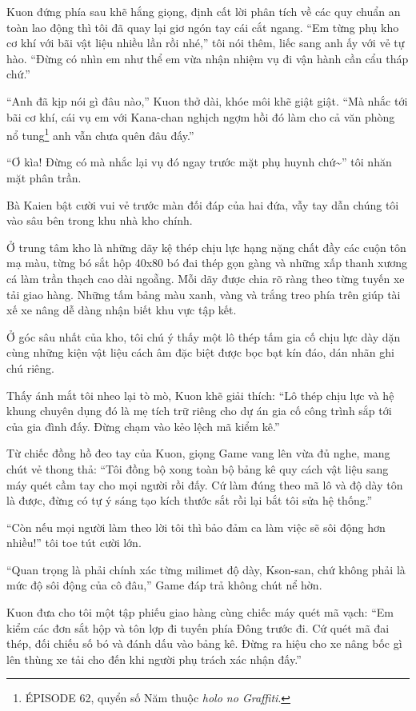 ﻿\documentclass[../main.tex]{subfiles}
\begin{document}
Kuon đứng phía sau khẽ hắng giọng, định cất lời phân tích về các quy chuẩn an toàn lao động thì tôi đã quay lại giơ ngón tay cái cắt ngang. ``Em từng phụ kho cơ khí với bãi vật liệu nhiều lần rồi nhé,'' tôi nói thêm, liếc sang anh ấy với vẻ tự hào. ``Đừng có nhìn em như thể em vừa nhận nhiệm vụ đi vận hành cần cẩu tháp chứ.''

``Anh đã kịp nói gì đâu nào,'' Kuon thở dài, khóe môi khẽ giật giật. ``Mà nhắc tới bãi cơ khí, cái vụ em với Kana-chan nghịch ngợm hồi đó làm cho cả văn phòng nổ tung\footnote{{\flaregothic ÉPISODE 62}, quyển số Năm thuộc \textit{holo no Graffiti}.} anh vẫn chưa quên đâu đấy.''

``Ơ kìa! Đừng có mà nhắc lại vụ đó ngay trước mặt phụ huynh chứ\~{}'' tôi nhăn mặt phân trần.

Bà Kaien bật cười vui vẻ trước màn đối đáp của hai đứa, vẫy tay dẫn chúng tôi vào sâu bên trong khu nhà kho chính.

Ở trung tâm kho là những dãy kệ thép chịu lực hạng nặng chất đầy các cuộn tôn mạ màu, từng bó sắt hộp 40x80 bó đai thép gọn gàng và những xấp thanh xương cá làm trần thạch cao dài ngoẵng. Mỗi dãy được chia rõ ràng theo từng tuyến xe tải giao hàng. Những tấm bảng màu xanh, vàng và trắng treo phía trên giúp tài xế xe nâng dễ dàng nhận biết khu vực tập kết.

Ở góc sâu nhất của kho, tôi chú ý thấy một lô thép tấm gia cố chịu lực dày dặn cùng những kiện vật liệu cách âm đặc biệt được bọc bạt kín đáo, dán nhãn ghi chú riêng.

Thấy ánh mắt tôi nheo lại tò mò, Kuon khẽ giải thích: ``Lô thép chịu lực và hệ khung chuyên dụng đó là mẹ tích trữ riêng cho dự án gia cố công trình sắp tới của gia đình đấy. Đừng chạm vào kẻo lệch mã kiểm kê.''

Từ chiếc đồng hồ đeo tay của Kuon, giọng Game vang lên vừa đủ nghe, mang chút vẻ thong thả: ``Tôi đồng bộ xong toàn bộ bảng kê quy cách vật liệu sang máy quét cầm tay cho mọi người rồi đấy. Cứ làm đúng theo mã lô và độ dày tôn là được, đừng có tự ý sáng tạo kích thước sắt rồi lại bắt tôi sửa hệ thống.''

``Còn nếu mọi người làm theo lời tôi thì bảo đảm ca làm việc sẽ sôi động hơn nhiều!'' tôi toe tút cười lớn.

``Quan trọng là phải chính xác từng milimet độ dày, Kson-san, chứ không phải là mức độ sôi động của cô đâu,'' Game đáp trả không chút nể hờn.

Kuon đưa cho tôi một tập phiếu giao hàng cùng chiếc máy quét mã vạch: ``Em kiểm các đơn sắt hộp và tôn lợp đi tuyến phía Đông trước đi. Cứ quét mã đai thép, đối chiếu số bó và đánh dấu vào bảng kê. Đừng ra hiệu cho xe nâng bốc gì lên thùng xe tải cho đến khi người phụ trách xác nhận đấy.''
\end{document}
